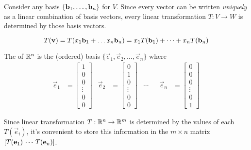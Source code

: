 \begin{applicationActivities}{1}{17}
\begin{fact}
Consider any basis \(\{\mathbf b_1,\dots,\mathbf b_n\}\) for $V$.  Since every vector can be written \textit{uniquely} as a linear combination of basis vectors, every linear transformation $T:V \rightarrow W$ is determined by those basis vectors.

\[
  T(\mathbf v)=T(x_1\mathbf b_1+\dots x_n\mathbf b_n)=
  x_1T(\mathbf b_1)+\dots+x_nT(\mathbf b_n)
\]
\end{fact}

\begin{definition}
The  of $\mathbb{R}^n$ is the (ordered) basis $\{\vec{e}_1, \vec{e}_2, \ldots, \vec{e}_n\}$ where
\begin{align*}
\vec{e}_1 &= \begin{bmatrix} 1 \\ 0 \\ 0 \\\vdots \\ 0 \\ 0 \end{bmatrix}  &
\vec{e}_2 &= \begin{bmatrix} 0 \\ 1 \\ 0 \\\vdots \\ 0 \\ 0 \end{bmatrix}  & \cdots  & &
\vec{e}_n &= \begin{bmatrix} 0 \\ 0 \\ 0 \\\vdots \\ 0 \\ 1 \end{bmatrix}
\end{align*}

Since linear transformation \(T:\mathbb{R}^n\to\mathbb{R}^m\) is determined by
the values of each \(T(\vec e_i)\), it's convenient to store this
information in the \(m\times n\) matrix
\([T(\mathbf e_1) \,\cdots\, T(\mathbf e_n)]\).
\end{definition}



\end{applicationActivities}

